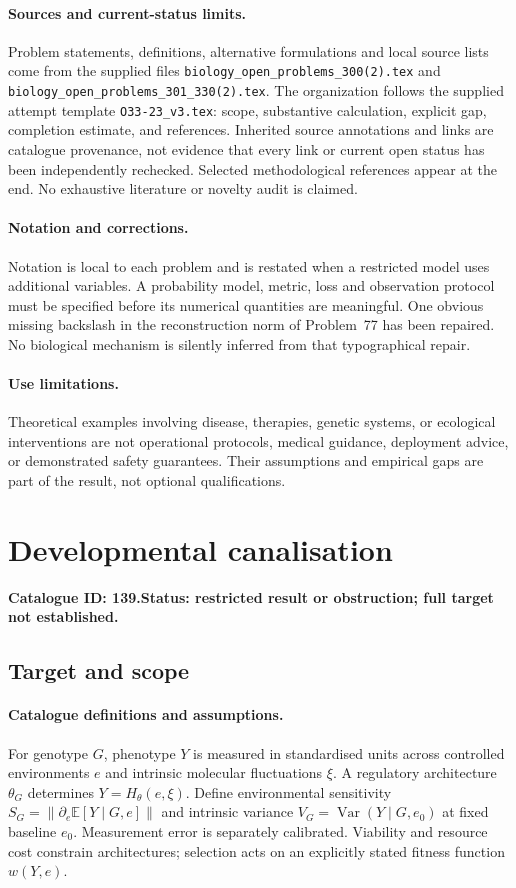 \documentclass[11pt]{article}
\newcommand{\E}{\mathbb E}
\DeclareMathOperator{\Var}{Var}
\providecommand{\E}{\mathbb E}
\providecommand{\Var}{\operatorname{Var}}
\begin{document}
\paragraph{Sources and current-status limits.}
Problem statements, definitions, alternative formulations and local source lists
come from the supplied files
\texttt{biology\_open\_problems\_300(2).tex} and
\texttt{biology\_open\_problems\_301\_330(2).tex}.
The organization follows the supplied attempt template
\texttt{O33-23\_v3.tex}: scope, substantive calculation, explicit gap,
completion estimate, and references. Inherited source annotations and links are
catalogue provenance, not evidence that every link or current open status has
been independently rechecked. Selected methodological references appear at the
end. No exhaustive literature or novelty audit is claimed.

\paragraph{Notation and corrections.}
Notation is local to each problem and is restated when a restricted model uses
additional variables. A probability model, metric, loss and observation protocol
must be specified before its numerical quantities are meaningful. One obvious
missing backslash in the reconstruction norm of Problem~77 has been repaired.
No biological mechanism is silently inferred from that typographical repair.

\paragraph{Use limitations.}
Theoretical examples involving disease, therapies, genetic systems, or ecological
interventions are not operational protocols, medical guidance, deployment advice,
or demonstrated safety guarantees. Their assumptions and empirical gaps are part
of the result, not optional qualifications.

\setcounter{section}{138}
\section{Developmental canalisation}
\label{prob:139}
\noindent\textbf{Catalogue ID: 139.}\quad \textbf{Status: restricted result or obstruction; full target not established.}
\subsection{Target and scope}
\paragraph{Catalogue definitions and assumptions.}
For genotype $G$, phenotype $Y$ is measured in standardised units across controlled environments $e$ and intrinsic molecular fluctuations $\xi$. A regulatory architecture $\theta_G$ determines $Y=H_\theta(e,\xi)$. Define environmental sensitivity $S_G=\|\partial_e\E[Y\mid G,e]\|$ and intrinsic variance $V_G=\Var(Y\mid G,e_0)$ at fixed baseline $e_0$. Measurement error is separately calibrated. Viability and resource cost constrain architectures; selection acts on an explicitly stated fitness function $w(Y,e)$.
\end{document}
